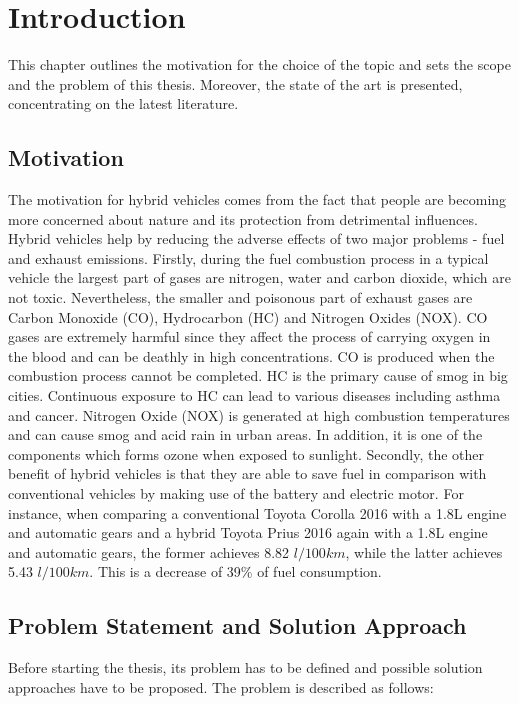 \chapter{Introduction}
\label{chp:intro}
This chapter outlines the motivation for the choice of the topic and sets the scope and the problem of this thesis. Moreover, the state of the art is presented, concentrating on the latest literature.

\section{Motivation}
The motivation for hybrid vehicles comes from the fact that people are becoming more concerned about nature and its protection from detrimental influences. Hybrid vehicles help by reducing the adverse effects of two major problems - fuel and exhaust emissions. Firstly, during the fuel combustion process in a typical vehicle the largest part of gases are nitrogen, water and carbon dioxide, which are not toxic. Nevertheless, the smaller and poisonous part of exhaust gases are Carbon Monoxide (CO), Hydrocarbon (HC) and Nitrogen Oxides (NOX). CO gases are extremely harmful since they affect the process of carrying oxygen in the blood and can be deathly in high concentrations. CO is produced when the combustion process cannot be completed. HC is the primary cause of smog in big cities. Continuous exposure to HC can lead to various diseases including asthma and cancer. Nitrogen Oxide (NOX) is generated at high combustion temperatures and can cause smog and acid rain in urban areas. In addition, it is one of the components which forms ozone when exposed to sunlight. Secondly, the other benefit of hybrid vehicles is that they are able to save fuel in comparison with conventional vehicles by making use of the battery and electric motor. For instance, when comparing a conventional Toyota Corolla 2016 with a 1.8L engine and automatic gears and a hybrid Toyota Prius 2016 again with a 1.8L engine and automatic gears, the former achieves 8.82 $l/100km$, while the latter achieves 5.43 $l/100km$. This is a decrease of 39\% of fuel consumption.

\section{Problem Statement and Solution Approach}
Before starting the thesis, its problem has to be defined and possible solution approaches have to be proposed. The problem is described as follows:

